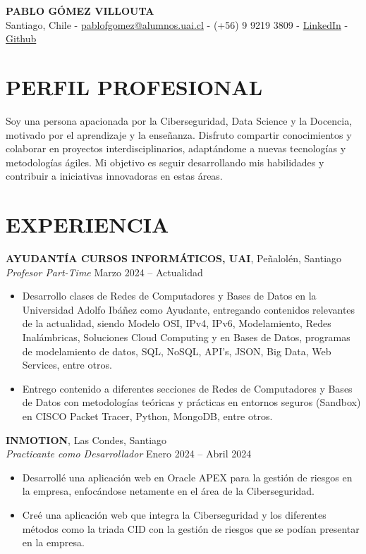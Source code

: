 \documentclass[a4paper,10pt]{article}
\begin{document}
\begin{center}
    {\LARGE \textbf{PABLO GÓMEZ VILLOUTA}} \\
    Santiago, Chile - \href{mailto:pablofgomez@alumnos.uai.cl}{pablofgomez@alumnos.uai.cl} - (+56) 9 9219 3809 - \href{https://www.linkedin.com/in/pablo-g%C3%B3mez-villouta-601868288/}{LinkedIn} - \href{https://github.com/PabloGomez-97}{Github}
\end{center}

\section*{PERFIL PROFESIONAL}
Soy una persona apacionada por la Ciberseguridad, Data Science y la Docencia, motivado por el aprendizaje y la enseñanza. Disfruto compartir conocimientos y colaborar en proyectos interdisciplinarios, adaptándome a nuevas tecnologías y metodologías ágiles. Mi objetivo es seguir desarrollando mis habilidades y contribuir a iniciativas innovadoras en estas áreas.

\section*{EXPERIENCIA}
\textbf{AYUDANTÍA CURSOS INFORMÁTICOS, UAI}, Peñalolén, Santiago \\
\textit{Profesor Part-Time} \hfill Marzo 2024 – Actualidad
\begin{itemize}[noitemsep]
    \item Desarrollo clases de Redes de Computadores y Bases de Datos en la Universidad Adolfo Ibáñez como Ayudante, entregando contenidos relevantes de la actualidad, siendo Modelo OSI, IPv4, IPv6, Modelamiento, Redes Inalámbricas, Soluciones Cloud Computing y en Bases de Datos, programas de modelamiento de datos, SQL, NoSQL, API’s, JSON, Big Data, Web Services, entre otros.
    \item Entrego contenido a diferentes secciones de Redes de Computadores y Bases de Datos con metodologías teóricas y prácticas en entornos seguros (Sandbox) en CISCO Packet Tracer, Python, MongoDB, entre otros.
\end{itemize}
\noindent
\textbf{INMOTION}, Las Condes, Santiago \\
\textit{Practicante como Desarrollador} \hfill Enero 2024 – Abril 2024
\begin{itemize}[noitemsep]
    \item Desarrollé una aplicación web en Oracle APEX para la gestión de riesgos en la empresa, enfocándose netamente en el área de la Ciberseguridad.
    \item Creé una aplicación web que integra la Ciberseguridad y los diferentes métodos como la triada CID con la gestión de riesgos que se podían presentar en la empresa.
\end{itemize}
\end{document}

